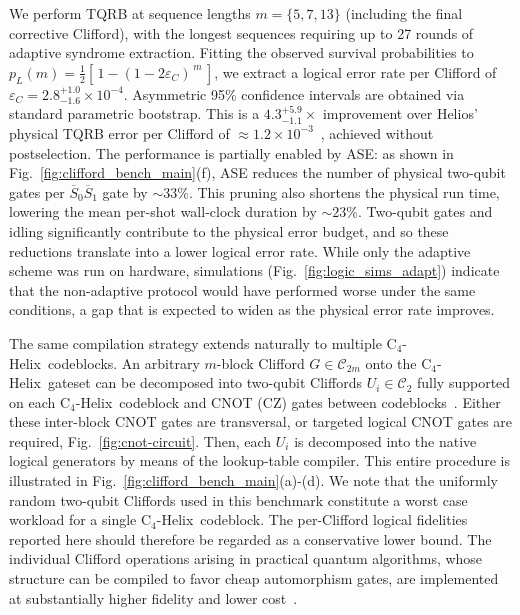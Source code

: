 \documentclass[aps,prx,reprint,showpacs,twocolumn,superscriptaddress,eqsecnum]{revtex4-2}
\newcommand{\chelix}{C$_4$-Helix}
\newcommand{\drewcmt}[1]{\textcolor{red}{\it\small Drew: #1}}
\begin{document}
We perform TQRB at sequence lengths $m=\{5,7,13\}$ (including the final corrective Clifford), with the longest sequences requiring up to 27 rounds of adaptive syndrome extraction. Fitting the observed survival probabilities to 
$
  p_L(m) = \tfrac{1}{2}\left[\,1 - (1-2\varepsilon_C)^{\,m}\,\right]$,
we extract a logical error rate per Clifford of $\varepsilon_C = 2.8^{+1.0}_{-1.6}\times 10^{-4}$. Asymmetric 95\% confidence intervals are obtained via standard parametric bootstrap. This is a $4.3^{+5.9}_{-1.1} \times$ improvement over Helios' physical TQRB error per Clifford of $\approx 1.2\times 10^{-3}$~\cite{Ransford2026}, achieved without postselection. The performance is partially enabled by ASE: as shown in Fig.~\ref{fig:clifford_bench_main}(f), ASE reduces the number of physical two-qubit gates per $\overline{S}_0 \overline{S}_1$ gate by $\sim 33\%$. This pruning also shortens the physical run time, lowering the mean per-shot wall-clock duration by $\sim 23\%$. Two-qubit gates and idling significantly contribute to the physical error budget, and so these reductions translate into a lower logical error rate. While only the adaptive scheme was run on hardware, simulations (Fig.~\ref{fig:logic_sims_adapt}) indicate that the non-adaptive protocol would have performed worse under the same conditions, a gap that is expected to widen as the physical error rate improves.

The same compilation strategy extends naturally to multiple \chelix\ codeblocks. An arbitrary $m$-block Clifford $G \in \mathcal{C}_{2m}$ onto the \chelix\ gateset can be decomposed into two-qubit Cliffords $U_i \in \mathcal{C}_2$ fully supported on each \chelix\ codeblock and CNOT (CZ) gates between codeblocks~\cite{Aaronson_2004, maslov2017}. Either these inter-block CNOT gates are transversal, or targeted logical CNOT gates are required, Fig.~\ref{fig:cnot-circuit}. Then, each $U_i$ is decomposed into the native logical generators by means of the lookup-table compiler. This entire procedure is illustrated in Fig.~\ref{fig:clifford_bench_main}(a)-(d).
We note that the uniformly random two-qubit Cliffords used in this benchmark constitute a worst case workload for a single \chelix\ codeblock. The per-Clifford logical fidelities reported here should therefore be regarded as a conservative lower bound. The individual Clifford operations arising in practical quantum algorithms, whose structure can be compiled to favor cheap automorphism gates, are implemented at substantially higher fidelity and lower cost~\cite{LeBlond2026InPrep}.
\end{document}
